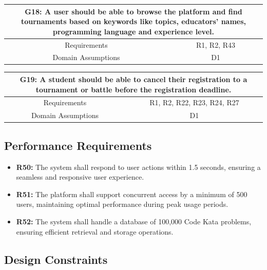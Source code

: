 \documentclass{article}
\begin{document}
\begin{table}[H]
    \centering
    \begin{tabular*}{\linewidth}{@{\extracolsep{\fill}} cc }
        \hline
        \multicolumn{2}{|c|}{\parbox{0.9\dimexpr\textwidth-2\tabcolsep\relax}{\centering\textbf{G18: A user should be able to browse the platform and find tournaments based on keywords like topics, educators’ names, programming language and experience level.}}} \\
        \hline
        Requirements & R1, R2, R43\\
        \hline
        Domain Assumptions & D1\\
        \hline
    \end{tabular*}
\end{table}

\begin{table}[H]
    \centering
    \begin{tabular*}{\linewidth}{@{\extracolsep{\fill}} cc }
        \hline
        \multicolumn{2}{|c|}{\parbox{0.9\dimexpr\textwidth-2\tabcolsep\relax}{\centering\textbf{G19: A student should be able to cancel their registration to a tournament or battle before the registration deadline.}}} \\
        \hline
        Requirements & R1, R2, R22, R23, R24, R27\\
        \hline
        Domain Assumptions & D1\\
        \hline
    \end{tabular*}
\end{table}


\subsection{Performance Requirements}
\begin{itemize}
  \item \textbf{R50:} The system shall respond to user actions within 1.5 seconds, ensuring a seamless and responsive user experience.
  \item \textbf{R51:} The platform shall support concurrent access by a minimum of 500 users, maintaining optimal performance during peak usage periods.
  \item \textbf{R52:} The system shall handle a database of 100,000 Code Kata problems, ensuring efficient retrieval and storage operations.
\end{itemize}

\subsection{Design Constraints}
\end{document}
